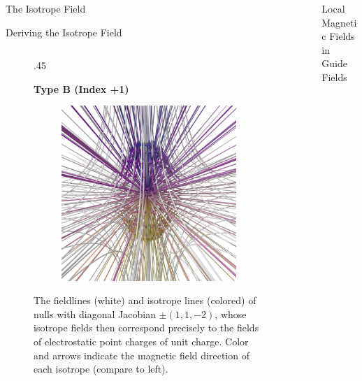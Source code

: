 \documentclass[final]{beamer}
\newlength{\sepwid}
\newlength{\onecolwid}
\begin{document}
\begin{frame}[t]
\begin{columns}[t]
\begin{column}{\onecolwid}
\begin{block}{\huge{The Isotrope Field}}
\begin{block}{Deriving the Isotrope Field}
\begin{figure}
\begin{columns}[t,totalwidth=\onecolwid]
    \begin{column}{.45\onecolwid}
        \begin{centering}
        \textbf{Type B (Index +1)}
        \begin{figure}
        \includegraphics[width=.45\onecolwid]{fig/nulltropes.png}
        \end{figure}
    \end{centering}
    \end{column}
  \end{columns}
  \caption{The fieldlines (white) and isotrope lines (colored)
    of nulls with diagonal Jacobian $\pm(1,1,-2)$, whose isotrope fields then correspond precisely to
    the fields of electrostatic point charges of unit charge.
    Color and arrows indicate the magnetic field direction of each isotrope (compare to left).}
  \end{figure}
\end{block}

\end{block}
\end{column}


\begin{column}{\sepwid}\end{column} %

\begin{column}{\onecolwid}
\begin{block}{\huge{Local Magnetic Fields in Guide Fields}}


\end{block}
\end{column}
\end{columns}
\end{frame}
\end{document}
